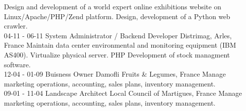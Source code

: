 \documentclass[]{friggeri-cv}
\begin{document}
\begin{entrylist}
        {Design and development of a world expert online exhibitions website on Linux/Apache/PHP/Zend platform. Design, development of a Python web crawler.\\}
    \entry
        {04-11 - 06-11}
        {System Administrator / Backend Developer}
        {Distrimag, Arles, France}
        {Maintain data center environmental and monitoring equipment (IBM AS400). Virtualize physical server. PHP Development of stock managment software.\\}
    \entry
        {12-04 - 01-09}
        {Buisness Owner}
        {Damofli Fruits \& Legumes, France}
        {Manage marketing operations, accounting, sales plans, inventory management.\\}
    \entry
        {09-01 - 11-04}
        {Landscape Architect}
        {Local Council of Martigues, France}
        {Manage marketing operations, accounting, sales plans, inventory management.\\}
\end{entrylist}
\end{document}
